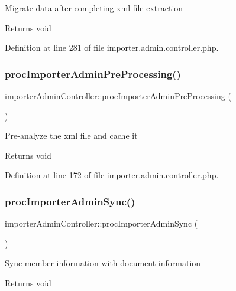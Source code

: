 Migrate data after completing xml file extraction \begin{DoxyReturn}{Returns}
void 
\end{DoxyReturn}


Definition at line 281 of file importer.\+admin.\+controller.\+php.

\mbox{\label{classimporterAdminController_a112303ff9925d381a27f526b97909205}} 
\subsubsection{\texorpdfstring{proc\+Importer\+Admin\+Pre\+Processing()}{procImporterAdminPreProcessing()}}
{\footnotesize\ttfamily importer\+Admin\+Controller\+::proc\+Importer\+Admin\+Pre\+Processing (\begin{DoxyParamCaption}{ }\end{DoxyParamCaption})}

Pre-\/analyze the xml file and cache it \begin{DoxyReturn}{Returns}
void 
\end{DoxyReturn}


Definition at line 172 of file importer.\+admin.\+controller.\+php.

\mbox{\label{classimporterAdminController_a979a756ae2a180270e08f72536c85d74}} 
\subsubsection{\texorpdfstring{proc\+Importer\+Admin\+Sync()}{procImporterAdminSync()}}
{\footnotesize\ttfamily importer\+Admin\+Controller\+::proc\+Importer\+Admin\+Sync (\begin{DoxyParamCaption}{ }\end{DoxyParamCaption})}

Sync member information with document information \begin{DoxyReturn}{Returns}
void 
\end{DoxyReturn}



